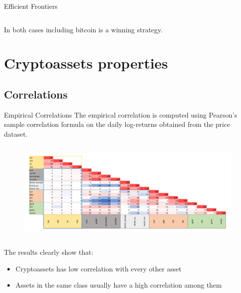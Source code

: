 \documentclass[aspectratio=169]{beamer}
\begin{document}
\begin{frame}{Efficient Frontiers}
\begin{columns}
\begin{column}{0.34\textwidth}
		\end{column}
	\end{columns}
	In both cases including bitcoin is a winning strategy.
\end{frame}

\section{Cryptoassets properties}

\subsection{Correlations}
\begin{frame}{Empirical Correlations}
	The empirical correlation is computed using Pearson's sample correlation formula on the daily log-returns obtained from the price dataset.
	\begin{figure}
		\centering
		\includegraphics[width=14cm, height=5cm, trim=4 4 4 4,clip]{Images/empcorr}
	\end{figure}
	The results clearly show that:
	\begin{itemize}
		\item Cryptoassets has low correlation with every other asset
		\item Assets in the same class usually have a high correlation among them
	\end{itemize}
\end{frame}

\end{document}
